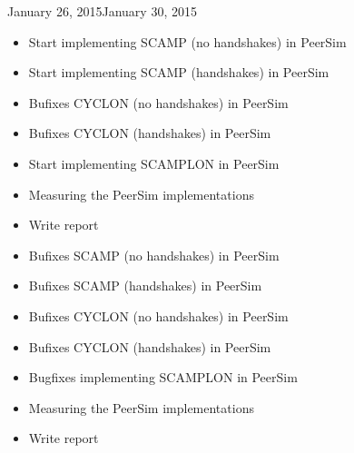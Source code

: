 \documentclass[11pt, english, screen]{report-rd-info}
\begin{document}
\begin{fichesuivi}{January 26, 2015}{January 30, 2015}

   \begin{travaileffectue}
   \begin{itemize}
   \item {Start implementing SCAMP (no handshakes) in PeerSim}
   \item {Start implementing SCAMP (handshakes) in PeerSim}
   \item {Bufixes CYCLON (no handshakes) in PeerSim}
   \item {Bufixes CYCLON (handshakes) in PeerSim}
   \item {Start implementing SCAMPLON in PeerSim}
   \item {Measuring the PeerSim implementations}
   \item {Write report}
      \end{itemize}
   \end{travaileffectue}

   \begin{travailnoneffectue}
   \end{travailnoneffectue}

   \begin{echange}
   \end{echange}

   \begin{planification}
   \begin{itemize}
   \item {Bufixes SCAMP (no handshakes) in PeerSim}
   \item {Bufixes SCAMP (handshakes) in PeerSim}
   \item {Bufixes CYCLON (no handshakes) in PeerSim}
   \item {Bufixes CYCLON (handshakes) in PeerSim}
    \item {Bugfixes implementing SCAMPLON in PeerSim}
   \item {Measuring the PeerSim implementations}
   \item {Write report}
      \end{itemize}
   \end{planification}
\end{fichesuivi}
\end{document}
